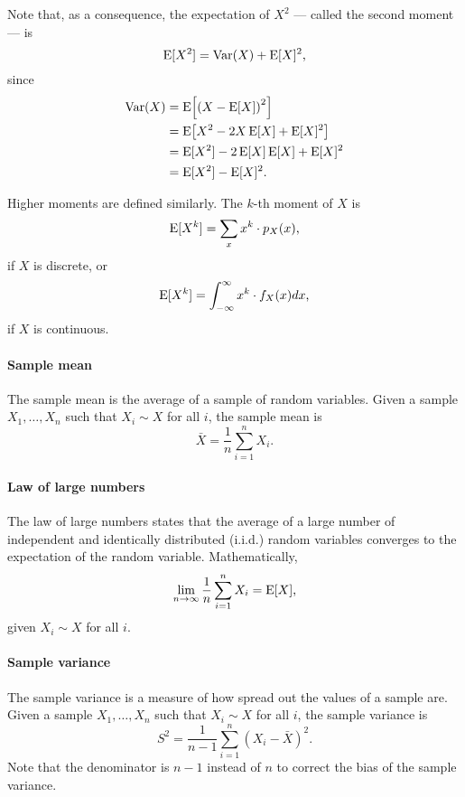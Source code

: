 Note that, as a consequence, the expectation of $X^2$ --- called the second moment --- is
\[
  \operatorname{E}[X^2] = \operatorname{Var}(X) + \operatorname{E}[X]^2\text{,}
\]
since
\begin{align*}
  \operatorname{Var}(X)
    &= \operatorname{E}\!\left[\left(X - \operatorname{E}[X]\right)^2\right] \\
    &= \operatorname{E}\!\left[X^2 - 2 X \operatorname{E}[X] + \operatorname{E}[X]^2\right] \\
    &= \operatorname{E}[X^2] - 2 \operatorname{E}[X] \operatorname{E}[X] + \operatorname{E}[X]^2 \\
    &= \operatorname{E}[X^2] - \operatorname{E}[X]^2\text{.}
\end{align*}

Higher moments are defined similarly.  The $k$-th moment of $X$ is
\begin{equation*}
  \operatorname{E}[X^k] = \sum_{x} x^k \cdot p_X(x)\text{,}
\end{equation*}
if $X$ is discrete, or
\begin{equation*}
  \operatorname{E}[X^k] = \int_{-\infty}^{\infty} x^k \cdot f_X(x) dx\text{,}
\end{equation*}
if $X$ is continuous.

\paragraph{Sample mean}  The sample mean is the average of a sample of random variables.
Given a sample $X_1, \dots, X_n$ such that $X_i \sim X$ for all $i$, the sample mean is
\begin{equation*}
  \bar{X} = \frac{1}{n} \sum_{i = 1}^n X_i\text{.}
\end{equation*}

\paragraph{Law of large numbers}  The law of large numbers states that the average of
a large number of independent and identically distributed (i.i.d.) random variables converges
to the expectation of the random variable.  Mathematically,
\begin{equation*}
  \lim_{n \rightarrow \infty} \frac{1}{n} \sum_{i = 1}^n X_i = \operatorname{E}[X]\text{,}
\end{equation*}
given $X_i \sim X$ for all $i$.

\paragraph{Sample variance}  The sample variance is a measure of how spread out the
values of a sample are.  Given a sample $X_1, \dots, X_n$ such that $X_i \sim X$ for all
$i$, the sample variance is
\begin{equation*}
  S^2 = \frac{1}{n - 1} \sum_{i = 1}^n (X_i - \bar{X})^2\text{.}
\end{equation*}
Note that the denominator is $n - 1$ instead of $n$ to correct the bias of the sample
variance.

